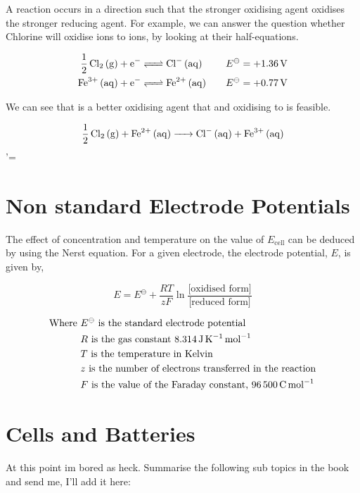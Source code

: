 \documentclass{scrbook}
\begin{document}
	A reaction occurs in a direction such that the stronger oxidising agent oxidises the stronger reducing agent. For example, we can answer the question whether Chlorine will oxidise  ions to  ions, by looking at their half-equations.

	\begin{align*}
		\ce{ 1/2Cl2 (g) + e- &<=> Cl- (aq)} && &E^\ominus &= \SI[explicit-sign=+]{1.36}{\volt} \\
		\ce{ Fe^{3+} (aq) + e- &<=> Fe^{2+} (aq) } && &E^\ominus &= \SI[explicit-sign=+]{0.77}{\volt}
	\end{align*}

	We can see that  is a better oxidising agent that  and  oxidising  to  is feasible.

	\[ \ce{1/2Cl2 (g) + Fe^{2+} (aq) -> Cl- (aq) + Fe^{3+} (aq) } \]'=

\section{Non standard Electrode Potentials}

	The effect of concentration and temperature on the value of $E_{\text{cell}}$ can be deduced by using the Nerst equation. For a given electrode, the electrode potential, $E$, is given by,

	\[ E = E^\ominus + \frac{RT}{zF}\ln{\frac{\text{[oxidised form]}}{\text{[reduced form]}}} \]

	\begin{align*}
		\text{Where } 
		& E^\ominus \text{ is the standard electrode potential} \\
		& R \text{ is the gas constant \SI{8.314}{\joule\per\kelvin\per\mole}} \\
		& T \text{ is the temperature in Kelvin} \\
		& z \text{ is the number of electrons transferred in the reaction} \\
		& F \text{ is the value of the Faraday constant, \SI{96500}{\coulomb\per\mole}}
	\end{align*}

\section{Cells and Batteries}

	At this point im bored as heck. Summarise the following sub topics in the book and send me, I'll add it here:
\end{document}
